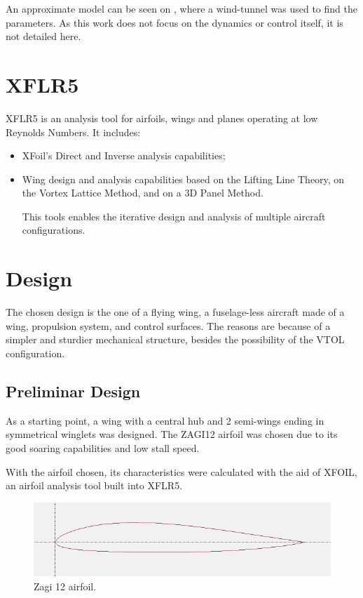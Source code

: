 An approximate model can be seen on \cite{7487466}, where a wind-tunnel was used to find the parameters. As this work does not focus on the dynamics or control itself, it is not detailed here.


\section{XFLR5}

XFLR5\cite{xflr5} is an analysis tool for airfoils, wings and planes operating at low Reynolds Numbers. It includes:
\begin{itemize}

\item XFoil's Direct and Inverse analysis capabilities;
\item Wing design and analysis capabilities based on the Lifting Line Theory, on the Vortex Lattice Method, and on a 3D Panel Method.

This tools enables the iterative design and analysis of multiple aircraft configurations.


\end{itemize}


\section{Design}

The chosen design is the one of a flying wing, a fuselage-less aircraft made of a wing, propulsion system, and control surfaces. The reasons are because of a simpler and sturdier mechanical structure, besides the possibility of the VTOL configuration.

\subsection{Preliminar Design}

As a starting point, a wing with a central hub and 2 semi-wings ending in symmetrical winglets was designed. The ZAGI12 airfoil was chosen due to its good soaring capabilities and low stall speed.

With the airfoil chosen, its characteristics were calculated with the aid of XFOIL, an airfoil analysis tool built into XFLR5.

\begin{figure}[h]
\centering
  \includegraphics[width=\linewidth]{figs/zagi12.png}
  \caption{Zagi 12 airfoil.}
  \label{fig:zagi12}
\end{figure}



